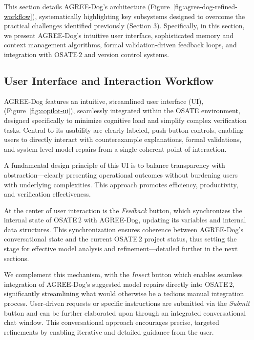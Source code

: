 \label{sec:design-architecture}

This section details AGREE-Dog’s architecture (Figure~\ref{fig:agree-dog-refined-workflow}), systematically highlighting key subsystems designed to overcome the practical challenges identified previously (Section 3). 
%
Specifically, in this section, we present AGREE-Dog’s intuitive user interface, sophisticated memory and context management algorithms, formal validation-driven feedback loops, and integration with OSATE\,2 and version control systems.



\subsection{User Interface and Interaction Workflow}
AGREE-Dog features an intuitive, streamlined user interface (UI), (Figure~\ref{fig:copilot-ui}), seamlessly integrated within the OSATE environment, designed specifically to minimize cognitive load and simplify complex verification tasks. Central to its usability are clearly labeled, push-button controls, enabling users to directly interact with counterexample explanations, formal validations, and system-level model repairs from a single coherent point of interaction.

A fundamental design principle of this UI is to balance transparency with abstraction—clearly presenting operational outcomes without burdening users with underlying complexities. This approach promotes efficiency, productivity, and verification effectiveness.

At the center of user interaction is the \textit{Feedback} button, which synchronizes the internal state of OSATE\,2 with AGREE-Dog, updating its variables and internal data structures. This synchronization ensures coherence between AGREE-Dog's conversational state and the current OSATE\,2 project status, thus setting the stage for effective model analysis and refinement—detailed further in the next sections.%
%

We complement this mechanism, with the \textit{Insert} button which enables seamless integration of AGREE-Dog’s suggested model repairs directly into OSATE\,2,
significantly streamlining what would otherwise be a tedious manual integration process.
%
User-driven requests or specific instructions are submitted via the \textit{Submit} button and can be further elaborated upon through an integrated conversational chat window. This conversational approach encourages precise, targeted refinements by enabling iterative and detailed guidance from the user.


